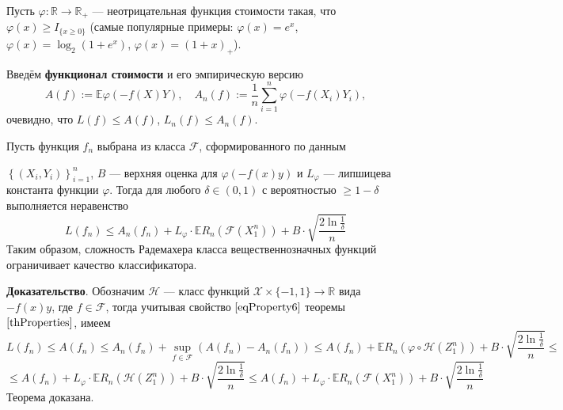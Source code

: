 \documentclass[12pt]{article}
\newtheorem{theorem}{\hskip\parindent Теорема}%
\begin{document}
Пусть $\varphi: \mathbb{R}\to\mathbb{R}_+$ --- неотрицательная функция стоимости такая, что $\varphi(x)\geqslant I_{\{x\geqslant0\}}$ (самые популярные примеры: $\varphi(x)=e^x$, $\varphi(x)=\log_2(1+e^x)$, $\varphi(x)=(1+x)_+$).

Введём \textbf{функционал стоимости} и его эмпирическую версию
\begin{equation*}
	A(f):=\mathbb{E}\varphi(-f(X)Y), \quad A_n(f):=\frac{1}{n}\sum\limits_{i=1}^{n}\varphi(-f(X_i)Y_i),
\end{equation*}
очевидно, что $L(f)\leqslant A(f)$, $L_n(f)\leqslant A_n(f)$.
\begin{theorem}
	Пусть функция $f_n$ выбрана из класса $\mathcal{F}$, сформированного по данным
	
	\noindent $\left\{(X_i,Y_i)\right\}_{i=1}^{n}$, $B$ --- верхняя оценка для $\varphi(-f(x)y)$ и $L_\varphi$ --- липшицева константа функции $\varphi$. Тогда для любого $\delta\in(0,1)$ с вероятностью $\geqslant1-\delta$ выполняется неравенство
	\begin{equation*}
		L(f_n)\leqslant A_n(f_n)+L_\varphi\cdot\mathbb{E}R_n(\mathcal{F}(X_1^n))+B\cdot\sqrt{\frac{2\ln\frac{1}{\delta}}{n}}
	\end{equation*}
	Таким образом, сложность Радемахера класса вещественнозначных функций ограничивает качество классификатора.
\end{theorem}

\textbf{Доказательство}. Обозначим $\mathcal{H}$ --- класс функций $\mathcal{X}\times\{-1,1\}\to\mathbb{R}$ вида $-f(x)y$, где $f\in\mathcal{F}$, тогда учитывая свойство $\eqref{eqProperty6}$ теоремы $\ref{thProperties}$, имеем
\begin{equation*}
	L(f_n)\leqslant A(f_n)\leqslant A_n(f_n)+\sup\limits_{f\in\mathcal{F}}(A(f_n)-A_n(f_n))\leqslant A(f_n)+\mathbb{E}R_n(\varphi\circ\mathcal{H}(Z_1^n))+B\cdot\sqrt{\frac{2\ln\frac{1}{\delta}}{n}}\leqslant
\end{equation*}
\begin{equation*}
	\leqslant A(f_n)+L_\varphi\cdot\mathbb{E}R_n(\mathcal{H}(Z_1^n))+B\cdot\sqrt{\frac{2\ln\frac{1}{\delta}}{n}}\leqslant A(f_n)+L_\varphi\cdot\mathbb{E}R_n(\mathcal{F}(X_1^n))+B\cdot\sqrt{\frac{2\ln\frac{1}{\delta}}{n}}
\end{equation*}
Теорема доказана.
\end{document}
